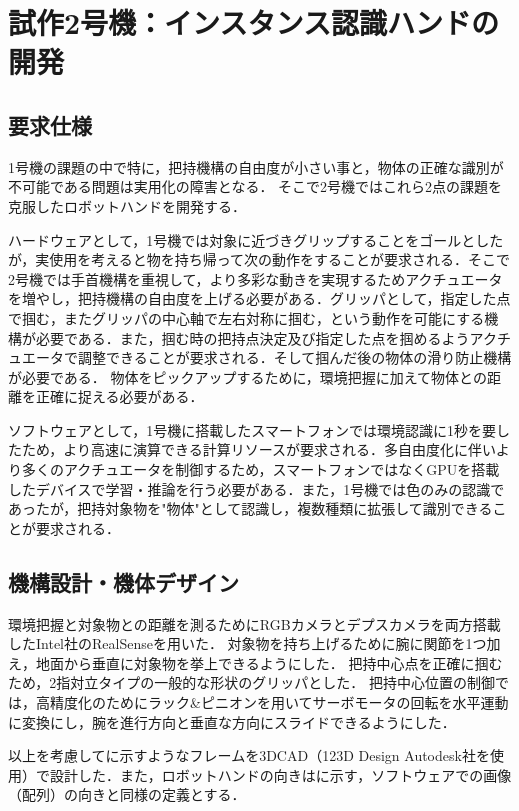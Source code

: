 \chapter{試作2号機：インスタンス認識ハンドの開発}
\newpage

\section{要求仕様}
1号機の課題の中で特に，把持機構の自由度が小さい事と，物体の正確な識別が不可能である問題は実用化の障害となる．
そこで2号機ではこれら2点の課題を克服したロボットハンドを開発する．

ハードウェアとして，1号機では対象に近づきグリップすることをゴールとしたが，実使用を考えると物を持ち帰って次の動作をすることが要求される．そこで2号機では手首機構を重視して，より多彩な動きを実現するためアクチュエータを増やし，把持機構の自由度を上げる必要がある．グリッパとして，指定した点で掴む，またグリッパの中心軸で左右対称に掴む，という動作を可能にする機構が必要である．また，掴む時の把持点決定及び指定した点を掴めるようアクチュエータで調整できることが要求される．そして掴んだ後の物体の滑り防止機構が必要である．
物体をピックアップするために，環境把握に加えて物体との距離を正確に捉える必要がある．

ソフトウェアとして，1号機に搭載したスマートフォンでは環境認識に1秒を要したため，より高速に演算できる計算リソースが要求される．多自由度化に伴いより多くのアクチュエータを制御するため，スマートフォンではなくGPUを搭載したデバイスで学習・推論を行う必要がある．また，1号機では色のみの認識であったが，把持対象物を"物体"として認識し，複数種類に拡張して識別できることが要求される．


\section{機構設計・機体デザイン}
環境把握と対象物との距離を測るためにRGBカメラとデプスカメラを両方搭載したIntel社のRealSenseを用いた．
対象物を持ち上げるために腕に関節を1つ加え，地面から垂直に対象物を挙上できるようにした．
把持中心点を正確に掴むため，2指対立タイプの一般的な形状のグリッパとした．
把持中心位置の制御では，高精度化のためにラック\&ピニオンを用いてサーボモータの回転を水平運動に変換にし，腕を進行方向と垂直な方向にスライドできるようにした．

以上を考慮してに示すようなフレームを3DCAD（123D Design Autodesk社を使用）で設計した．また，ロボットハンドの向きはに示す，ソフトウェアでの画像（配列）の向きと同様の定義とする．

